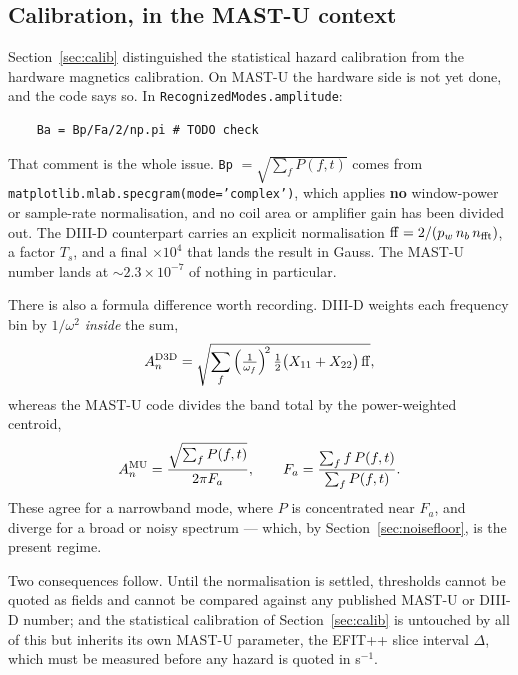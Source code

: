 \documentclass[11pt,a4paper]{article}
\newcommand{\code}[1]{\texttt{\small #1}}
\newcommand{\bk}{\discretionary{}{}{}}   %
\begin{document}
\subsection{Calibration, in the MAST-U context}

Section~\ref{sec:calib} distinguished the statistical hazard calibration from the hardware
magnetics calibration. On MAST-U the hardware side is not yet done, and the code says so.
In \code{RecognizedModes.amplitude}:
\begin{verbatim}
    Ba = Bp/Fa/2/np.pi # TODO check
\end{verbatim}

That comment is the whole issue. \code{Bp} $= \sqrt{\sum_f P(f,t)}$ comes from
\code{matplotlib.\bk mlab.\bk specgram(\bk mode='complex')}, which applies \textbf{no} window-power or
sample-rate normalisation, and no coil area or amplifier gain has been divided out. The
DIII-D counterpart carries an explicit normalisation $\mathrm{ff} = 2/(p_w\, n_b\, n_{\rm fft})$,
a factor $T_s$, and a final $\times 10^4$ that lands the result in Gauss. The MAST-U number
lands at $\sim\!2.3\times10^{-7}$ of nothing in particular.

There is also a formula difference worth recording. DIII-D weights each frequency bin by
$1/\omega^2$ \emph{inside} the sum,
\begin{equation}
A^{\rm D3D}_n = \sqrt{\sum_f \Big(\tfrac{1}{\omega_f}\Big)^{\!2}\,\tfrac{1}{2}\big(X_{11}+X_{22}\big)\,\mathrm{ff}},
\end{equation}
whereas the MAST-U code divides the band total by the power-weighted centroid,
\begin{equation}
A^{\rm MU}_n = \frac{\sqrt{\sum_f P(f,t)}}{2\pi F_a},
\qquad
F_a = \frac{\sum_f f\,P(f,t)}{\sum_f P(f,t)} .
\end{equation}
These agree for a narrowband mode, where $P$ is concentrated near $F_a$, and diverge for a
broad or noisy spectrum --- which, by Section~\ref{sec:noisefloor}, is the present regime.

Two consequences follow. Until the normalisation is settled, thresholds cannot be quoted as
fields and cannot be compared against any published MAST-U or DIII-D number; and the
statistical calibration of Section~\ref{sec:calib} is untouched by all of this but inherits
its own MAST-U parameter, the EFIT++ slice interval $\Delta$, which must be measured before
any hazard is quoted in s$^{-1}$.
\end{document}
